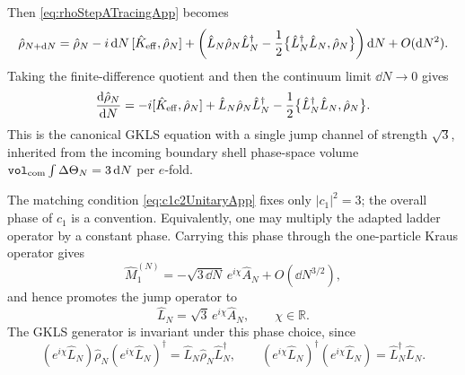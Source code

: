 \documentclass{article}
\newcommand{\VF}{\mathtt{vol}_{\rm com}}
\numberwithin{equation}{section}
\begin{document}
	Then \cref{eq:rhoStepATracingApp} becomes
	\begin{equation}
		\hat\rho_{N+\dd N} = \hat\rho_N - i\,\dd N\,[\hat K_{\rm eff},\hat\rho_N] + \left( \hat L_N\hat\rho_N\hat L_N^\dagger - \frac12 \bigl\{ \hat L_N^\dagger\hat L_N,\hat\rho_N \bigr\} \right)\dd N + O(\dd N^2).
		\label{eq:rhoStepWithHamiltonianApp}
	\end{equation}
	Taking the finite-difference quotient and then the continuum limit \(\dd N\to0\) gives
	\begin{equation}
		\frac{\dd\hat\rho_N}{\dd N} = -i[\hat K_{\rm eff},\hat\rho_N] + \hat L_N\hat\rho_N\hat L_N^\dagger - \frac12 \bigl\{ \hat L_N^\dagger\hat L_N,\hat\rho_N \bigr\}.
		\label{eq:GKLSFinalApp}
	\end{equation}
	This is the canonical GKLS equation with a single jump channel of strength \(\sqrt3\), inherited from the incoming boundary shell phase-space volume \(\VF\int\Delta\Theta_N=3\,\dd N\) per $e$-fold.

	The matching condition \cref{eq:c1c2UnitaryApp} fixes only \(|c_1|^2=3\); the overall phase of \(c_1\) is a convention. Equivalently, one may multiply the adapted ladder operator by a constant phase. Carrying this phase through the one-particle Kraus operator gives
	\begin{equation}
		\hat M_1^{(N)} = -\sqrt{3\,\dd N}\,e^{i\chi}\hat A_N + O(\dd N^{3/2}),
	\end{equation}
	and hence promotes the jump operator to
	\begin{equation}
		\hat L_N = \sqrt3\,e^{i\chi}\hat A_N, \qquad \chi\in\mathbb R.
	\end{equation}
	The GKLS generator is invariant under this phase choice, since
	\begin{equation}
		(e^{i\chi}\hat L_N)\hat\rho_N(e^{i\chi}\hat L_N)^\dagger = \hat L_N\hat\rho_N\hat L_N^\dagger, \qquad (e^{i\chi}\hat L_N)^\dagger(e^{i\chi}\hat L_N) = \hat L_N^\dagger\hat L_N .
	\end{equation}
\end{document}
